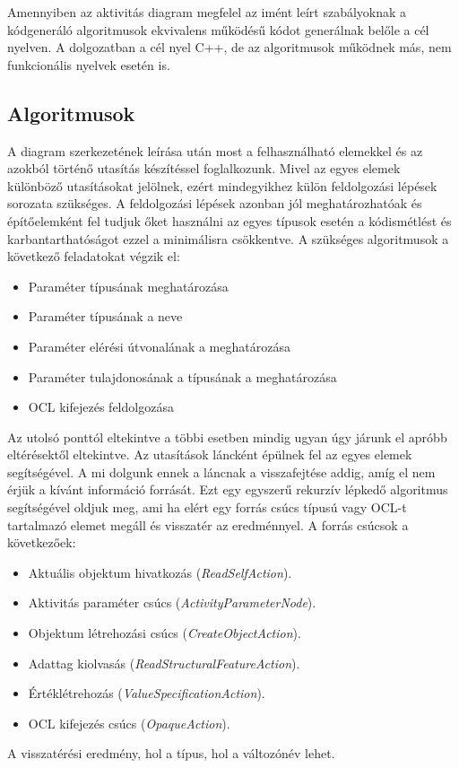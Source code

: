 \documentclass[a4paper,12pt]{report}
\begin{document}
Amennyiben az aktivitás diagram megfelel az imént leírt szabályoknak a kódgeneráló algoritmusok ekvivalens működésű kódot generálnak belőle a cél nyelven. A dolgozatban a cél nyel C++, de az algoritmusok működnek más, nem funkcionális nyelvek esetén is.

\subsection{Algoritmusok}

A diagram szerkezetének leírása után most a felhasználható elemekkel és az azokból történő utasítás készítéssel foglalkozunk. Mivel az egyes elemek különböző utasításokat jelölnek, ezért mindegyikhez külön feldolgozási lépések sorozata szükséges. A feldolgozási lépések azonban jól meghatározhatóak és építőelemként fel tudjuk őket használni az egyes típusok esetén a kódismétlést és karbantarthatóságot ezzel a minimálisra csökkentve. A szükséges algoritmusok a következő feladatokat végzik el:
\begin{itemize}
\item { Paraméter típusának meghatározása}
\item { Paraméter típusának a neve}
\item { Paraméter elérési útvonalának a meghatározása}
\item { Paraméter tulajdonosának a típusának a meghatározása}
\item { OCL kifejezés feldolgozása}
\end{itemize} 
Az utolsó ponttól eltekintve a többi esetben mindig ugyan úgy járunk el apróbb eltérésektől eltekintve. Az utasítások láncként épülnek fel az egyes elemek segítségével. A mi dolgunk ennek a láncnak a visszafejtése addig, amíg el nem érjük a kívánt információ forrását. Ezt egy egyszerű rekurzív lépkedő algoritmus segítségével oldjuk meg, ami ha elért egy forrás csúcs típusú vagy OCL-t tartalmazó elemet megáll és visszatér az eredménnyel. A forrás csúcsok a következőek: 
\begin{itemize}
\item Aktuális objektum hivatkozás ({\it ReadSelfAction}).
\item Aktivitás paraméter csúcs ({\it ActivityParameterNode}).
\item Objektum létrehozási csúcs ({\it CreateObjectAction}).
\item Adattag kiolvasás ({\it ReadStructuralFeatureAction}).
\item Értéklétrehozás ({\it ValueSpecificationAction}).
\item OCL kifejezés csúcs ({\it OpaqueAction}).
\end{itemize}
A visszatérési eredmény, hol a típus, hol a változónév lehet.
\end{document}

